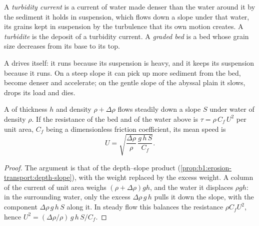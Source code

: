 \begin{definition}\label{def:b1:clastic-sediments:turbidite}
A \emph{turbidity current} is a current of water made
denser than the water around it by the sediment it holds in suspension, which
flows down a slope under that water, its grains kept in suspension by the
turbulence that its own motion creates. A \emph{turbidite} is
the deposit of a turbidity current. A \emph{graded bed} is a
bed whose grain size decreases from its base to its top.
\end{definition}

A  drives itself: it runs because its suspension is heavy, and
it keeps its suspension because it runs. On a steep slope it can pick up more
sediment from the bed, become denser and accelerate; on the gentle slope of the
abyssal plain it slows, drops its load and dies.

\begin{proposition}\label{prop:b1:clastic-sediments:turbidity}
A  of thickness $h$ and density $\rho + \Delta\rho$ flows
steadily down a slope $S$ under water of density $\rho$. If the resistance of
the bed and of the water above is $\tau = \rho\,C_f\,U^2$ per unit area, $C_f$
being a dimensionless friction coefficient, its mean speed is
\[
  U = \sqrt{\frac{\Delta\rho}{\rho}\,\frac{g\,h\,S}{C_f}} .
\]
\end{proposition}

\begin{proof}
The argument is that of the depth--slope product
(\cref{prop:b1:erosion-transport:depth-slope}), with the weight replaced by
the excess weight. A column of the current of unit area weighs $(\rho +
\Delta\rho) g h$, and the water it displaces $\rho g h$: in the surrounding
water, only the excess $\Delta\rho\,g\,h$ pulls it down the slope, with the
component $\Delta\rho\,g\,h\,S$ along it. In steady flow this balances the
resistance $\rho C_f U^2$, hence $U^2 = (\Delta\rho/\rho)\,g\,h\,S/C_f$.
\end{proof}

